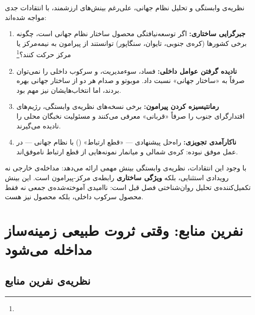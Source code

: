 نظریه‌ی وابستگی و تحلیل نظام جهانی، علی‌رغم بینش‌های ارزشمند، با انتقادات جدی مواجه شده‌اند:

\begin{tcolorbox}[failbox, title={نقدهای اصلی بر نظریه‌ی وابستگی}]
\begin{enumerate}
\item \textbf{جبرگرایی ساختاری:} اگر توسعه‌نیافتگی محصول ساختار نظام جهانی است، چگونه برخی کشورها (کره‌ی جنوبی، تایوان، سنگاپور) توانستند از پیرامون به نیمه‌مرکز یا مرکز حرکت کنند؟\footnote{}

\item \textbf{نادیده گرفتن عوامل داخلی:} فساد، سوءمدیریت، و سرکوب داخلی را نمی‌توان صرفاً به «ساختار جهانی» نسبت داد. موبوتو و صدام هر دو از ساختار جهانی بهره بردند، اما انتخاب‌هایشان نیز مهم بود.

\item \textbf{رمانتیسیزه کردن پیرامون:} برخی نسخه‌های نظریه‌ی وابستگی، رژیم‌های اقتدارگرای جنوب را صرفاً «قربانی» معرفی می‌کنند و مسئولیت نخبگان محلی را نادیده می‌گیرند.

\item \textbf{ناکارآمدی تجویزی:} راه‌حل پیشنهادی — «قطع ارتباط» () با نظام جهانی — در عمل موفق نبوده: کره‌ی شمالی و میانمار نمونه‌هایی از قطع ارتباط ناموفق‌اند.
\end{enumerate}
\end{tcolorbox}

با وجود این انتقادات، نظریه‌ی وابستگی بینش مهمی ارائه می‌دهد: مداخله‌ی خارجی نه رویدادی استثنایی، بلکه \textbf{ویژگی ساختاری} رابطه‌ی مرکز-پیرامون است. این بینش تکمیل‌کننده‌ی تحلیل روان‌شناختی فصل قبل است: ناامیدی آموخته‌شده‌ی جمعی نه فقط محصول سرکوب داخلی، بلکه محصول  نیز هست.


\section{نفرین منابع: وقتی ثروت طبیعی زمینه‌ساز مداخله می‌شود}
\label{sec:ch12-resource-curse}

\subsection{نظریه‌ی نفرین منابع}
\label{subsec:ch12-resource-theory}

